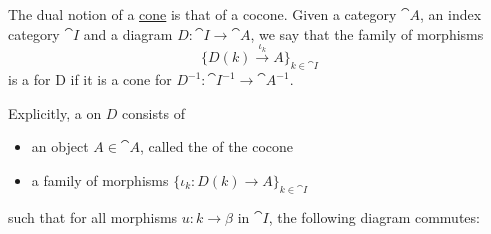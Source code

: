 \begin{definition}\label{def:categorical_cocone}\mcite\cite[def. 5.2.1]{Leinster2016Basic}
  The dual notion of a \hyperref[def:categorical_cone]{cone} is that of a cocone. Given a category \( \cat{A} \), an index category \( \cat{I} \) and a diagram \( D: \cat{I} \to \cat{A} \), we say that the family of morphisms
  \begin{equation*}
    \{ D(k) \overset {\iota_k} \to A \}_{k \in \cat{I}}
  \end{equation*}
  is a  for D if it is a cone for \( D^{-1}: \cat{I}^{-1} \to \cat{A}^{-1} \).

  Explicitly, a  on \( D \) consists of
  \begin{itemize}
    \item an object \( A \in \cat{A} \), called the  of the cocone
    \item a family of  morphisms \( \{ \iota_k: D(k) \to A \}_{k \in \cat{I}} \)
  \end{itemize}
  such that for all morphisms \( u: k \to \beta \) in \( \cat{I} \), the following diagram commutes:
  \begin{alignedeq}\label{def:categorical_cocone/universal_property}
    \iffalse\begin{mplibcode}
      beginfig(1);
      input metapost/graphs;

      v1 := thelabel("$A$", origin);
      v2 := thelabel("$D(k)$", (-1, 1) scaled u);
      v3 := thelabel("$D(\beta)$", (1, 1) scaled u);

      a1 := straight_arc(v2, v1);
      a2 := straight_arc(v3, v1);
      a3 := straight_arc(v2, v3);

      draw_vertices(v);
      draw_arcs(a);

      label.llft("$\iota_k$", straight_arc_midpoint of a1);
      label.lrt("$\iota_\beta$", straight_arc_midpoint of a2);
      label.top("$D(u)$", straight_arc_midpoint of a3);
      endfig;
    \end{mplibcode}\fi
  \end{alignedeq}
\end{definition}

